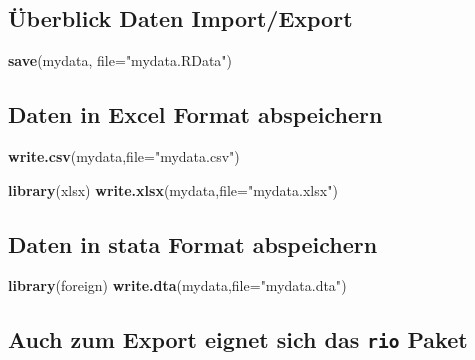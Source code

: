 \documentclass[]{article}
\newenvironment{Shaded}{\begin{snugshade}}{\end{snugshade}}
\newcommand{\KeywordTok}[1]{\textcolor[rgb]{0.13,0.29,0.53}{\textbf{{#1}}}}
\newcommand{\DataTypeTok}[1]{\textcolor[rgb]{0.13,0.29,0.53}{{#1}}}
\newcommand{\StringTok}[1]{\textcolor[rgb]{0.31,0.60,0.02}{{#1}}}
\newcommand{\NormalTok}[1]{{#1}}
\begin{document}
\subsection{Überblick Daten
Import/Export}\label{uberblick-daten-importexport}

\begin{Shaded}
\begin{Highlighting}[]
\KeywordTok{save}\NormalTok{(mydata, }\DataTypeTok{file=}\StringTok{"mydata.RData"}\NormalTok{)}
\end{Highlighting}
\end{Shaded}

\subsection{Daten in Excel Format
abspeichern}\label{daten-in-excel-format-abspeichern}

\begin{Shaded}
\begin{Highlighting}[]
\KeywordTok{write.csv}\NormalTok{(mydata,}\DataTypeTok{file=}\StringTok{"mydata.csv"}\NormalTok{) }
\end{Highlighting}
\end{Shaded}

\begin{Shaded}
\begin{Highlighting}[]
\KeywordTok{library}\NormalTok{(xlsx)}
\KeywordTok{write.xlsx}\NormalTok{(mydata,}\DataTypeTok{file=}\StringTok{"mydata.xlsx"}\NormalTok{) }
\end{Highlighting}
\end{Shaded}

\subsection{Daten in stata Format
abspeichern}\label{daten-in-stata-format-abspeichern}

\begin{Shaded}
\begin{Highlighting}[]
\KeywordTok{library}\NormalTok{(foreign)}
\KeywordTok{write.dta}\NormalTok{(mydata,}\DataTypeTok{file=}\StringTok{"mydata.dta"}\NormalTok{) }
\end{Highlighting}
\end{Shaded}

\subsection{\texorpdfstring{Auch zum Export eignet sich das \texttt{rio}
Paket}{Auch zum Export eignet sich das rio Paket}}\label{auch-zum-export-eignet-sich-das-rio-paket}
\end{document}
